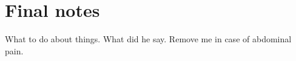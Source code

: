 \documentclass[12pt,chapterheads]{ucsd}
\begin{document}
%
%
%
%
%
%
%
%
%
%
%





\appendix
\chapter{Final notes}
What to do about things.  What did he say.
  Remove me in case of abdominal pain.



\end{document}
